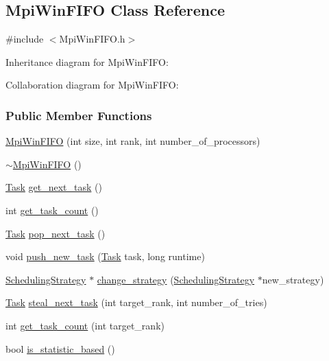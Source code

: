 \hypertarget{a00056}{}\subsection{Mpi\+Win\+F\+I\+F\+O Class Reference}
\label{a00056}


{\ttfamily \#include $<$Mpi\+Win\+F\+I\+F\+O.\+h$>$}



Inheritance diagram for Mpi\+Win\+F\+I\+F\+O\+:


Collaboration diagram for Mpi\+Win\+F\+I\+F\+O\+:
\subsubsection*{Public Member Functions}
\begin{DoxyCompactItemize}
\item 
\hyperlink{a00056_a52b5238edee8c348afbf0d370c81d8ce}{Mpi\+Win\+F\+I\+F\+O} (int size, int rank, int number\+\_\+of\+\_\+processors)
\item 
\hyperlink{a00056_a6ca0a6e127618d262ae40d3171bbb672}{$\sim$\+Mpi\+Win\+F\+I\+F\+O} ()
\item 
\hyperlink{a00002}{Task} \hyperlink{a00056_aeffee53a08818badfafed7642a41b955}{get\+\_\+next\+\_\+task} ()
\item 
int \hyperlink{a00056_a609d1de2a9afc8d82dfab9746fe7c885}{get\+\_\+task\+\_\+count} ()
\item 
\hyperlink{a00002}{Task} \hyperlink{a00056_a1ceb2f48f1ae2fbbf14ab9227ba8df9e}{pop\+\_\+next\+\_\+task} ()
\item 
void \hyperlink{a00056_ab250777bda97e37530c354683a87e8b4}{push\+\_\+new\+\_\+task} (\hyperlink{a00002}{Task} task, long runtime)
\item 
\hyperlink{a00076}{Scheduling\+Strategy} $\ast$ \hyperlink{a00056_ae5620542c597abff58986506d595c29e}{change\+\_\+strategy} (\hyperlink{a00076}{Scheduling\+Strategy} $\ast$new\+\_\+strategy)
\item 
\hyperlink{a00002}{Task} \hyperlink{a00056_a8f4af1f3c3f90b939f3638bf321be3bf}{steal\+\_\+next\+\_\+task} (int target\+\_\+rank, int number\+\_\+of\+\_\+tries)
\item 
int \hyperlink{a00056_a7481a465167e95e3993251106fe40cb3}{get\+\_\+task\+\_\+count} (int target\+\_\+rank)
\item 
bool \hyperlink{a00056_ab568b8ec6f8eb9baabaae8552a938204}{is\+\_\+statistic\+\_\+based} ()
\end{DoxyCompactItemize}
